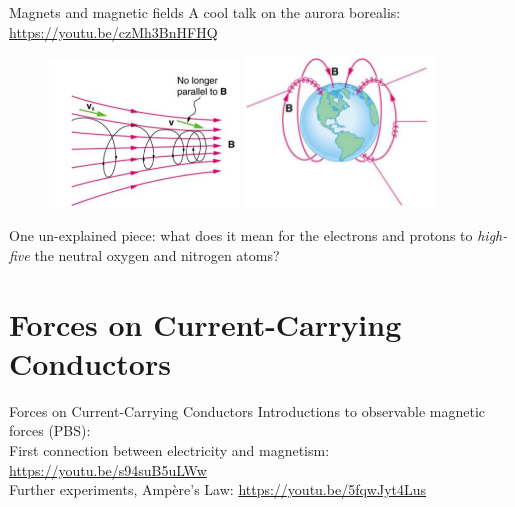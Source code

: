 \documentclass{beamer}
\begin{document}
\begin{frame}{Magnets and magnetic fields}
A cool talk on the aurora borealis:
\url{https://youtu.be/czMh3BnHFHQ} \\
\begin{figure}
\centering
\includegraphics[width=0.45\textwidth]{figures/mag1.png}
\includegraphics[width=0.45\textwidth]{figures/mag2.png}
\end{figure}
One un-explained piece: what does it mean for the electrons and protons to \textit{high-five} the neutral oxygen and nitrogen atoms?
\end{frame}

\section{Forces on Current-Carrying Conductors}

\begin{frame}{Forces on Current-Carrying Conductors}
Introductions to observable magnetic forces (PBS): \\ \vspace{1cm}
First connection between electricity and magnetism: \url{https://youtu.be/s94suB5uLWw} \\ \vspace{1cm}
Further experiments, Amp\`{e}re's Law: \url{https://youtu.be/5fqwJyt4Lus} \\ \vspace{1cm}
\end{frame}
\end{document}
